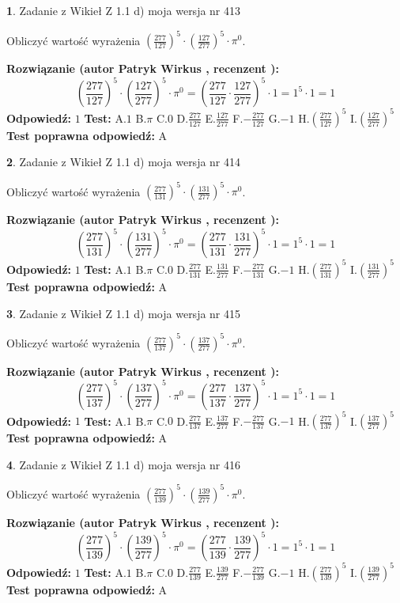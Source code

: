 \documentclass[12pt, a4paper]{article}
\theoremstyle{definition} %
\newtheorem{zad}{}
\newcommand{\zadStart}[1]{\begin{zad}#1\newline}
\newcommand{\zadStop}{\end{zad}}
\newcommand{\rozwStart}[2]{\noindent \textbf{Rozwiązanie (autor #1 , recenzent #2): }\newline}
\newcommand{\rozwStop}{\newline}
\newcommand{\odpStart}{\noindent \textbf{Odpowiedź:}\newline}
\newcommand{\odpStop}{\newline}
\newcommand{\testStart}{\noindent \textbf{Test:}\newline}
\newcommand{\testStop}{\newline}
\newcommand{\kluczStart}{\noindent \textbf{Test poprawna odpowiedź:}\newline}
\newcommand{\kluczStop}{\newline}
\begin{document}
\zadStart{Zadanie z Wikieł Z 1.1 d) moja wersja nr 413}

Obliczyć wartość wyrażenia $(\frac{277}{127})^{5} \cdot (\frac{127}{277})^{5} \cdot \pi^{0}$.
\zadStop
\rozwStart{Patryk Wirkus}{}
$$(\frac{277}{127})^{5} \cdot (\frac{127}{277})^{5} \cdot \pi^{0} = (\frac{277}{127} \cdot \frac{127}{277})^{5} \cdot 1 = 1^{5} \cdot 1 = 1$$
\rozwStop
\odpStart
$1$
\odpStop
\testStart
A.$1$ B.$\pi$ C.$0$ D.$\frac{277}{127}$ E.$\frac{127}{277}$
F.$-\frac{277}{127}$ G.$-1$
H.$(\frac{277}{127})^{5}$
I.$(\frac{127}{277})^{5}$
\testStop
\kluczStart
A
\kluczStop



\zadStart{Zadanie z Wikieł Z 1.1 d) moja wersja nr 414}

Obliczyć wartość wyrażenia $(\frac{277}{131})^{5} \cdot (\frac{131}{277})^{5} \cdot \pi^{0}$.
\zadStop
\rozwStart{Patryk Wirkus}{}
$$(\frac{277}{131})^{5} \cdot (\frac{131}{277})^{5} \cdot \pi^{0} = (\frac{277}{131} \cdot \frac{131}{277})^{5} \cdot 1 = 1^{5} \cdot 1 = 1$$
\rozwStop
\odpStart
$1$
\odpStop
\testStart
A.$1$ B.$\pi$ C.$0$ D.$\frac{277}{131}$ E.$\frac{131}{277}$
F.$-\frac{277}{131}$ G.$-1$
H.$(\frac{277}{131})^{5}$
I.$(\frac{131}{277})^{5}$
\testStop
\kluczStart
A
\kluczStop



\zadStart{Zadanie z Wikieł Z 1.1 d) moja wersja nr 415}

Obliczyć wartość wyrażenia $(\frac{277}{137})^{5} \cdot (\frac{137}{277})^{5} \cdot \pi^{0}$.
\zadStop
\rozwStart{Patryk Wirkus}{}
$$(\frac{277}{137})^{5} \cdot (\frac{137}{277})^{5} \cdot \pi^{0} = (\frac{277}{137} \cdot \frac{137}{277})^{5} \cdot 1 = 1^{5} \cdot 1 = 1$$
\rozwStop
\odpStart
$1$
\odpStop
\testStart
A.$1$ B.$\pi$ C.$0$ D.$\frac{277}{137}$ E.$\frac{137}{277}$
F.$-\frac{277}{137}$ G.$-1$
H.$(\frac{277}{137})^{5}$
I.$(\frac{137}{277})^{5}$
\testStop
\kluczStart
A
\kluczStop



\zadStart{Zadanie z Wikieł Z 1.1 d) moja wersja nr 416}

Obliczyć wartość wyrażenia $(\frac{277}{139})^{5} \cdot (\frac{139}{277})^{5} \cdot \pi^{0}$.
\zadStop
\rozwStart{Patryk Wirkus}{}
$$(\frac{277}{139})^{5} \cdot (\frac{139}{277})^{5} \cdot \pi^{0} = (\frac{277}{139} \cdot \frac{139}{277})^{5} \cdot 1 = 1^{5} \cdot 1 = 1$$
\rozwStop
\odpStart
$1$
\odpStop
\testStart
A.$1$ B.$\pi$ C.$0$ D.$\frac{277}{139}$ E.$\frac{139}{277}$
F.$-\frac{277}{139}$ G.$-1$
H.$(\frac{277}{139})^{5}$
I.$(\frac{139}{277})^{5}$
\testStop
\kluczStart
A
\kluczStop
\end{document}
